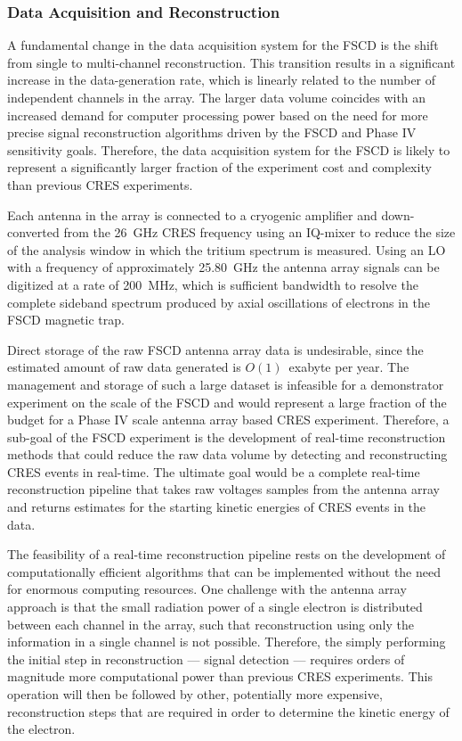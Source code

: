 \subsubsection*{Data Acquisition and Reconstruction}

A fundamental change in the data acquisition system for the FSCD is the shift from single to multi-channel reconstruction. This transition results in a significant increase in the data-generation rate, which is linearly related to the number of independent channels in the array. The larger data volume coincides with an increased demand for computer processing power based on the need for more precise signal reconstruction algorithms driven by the FSCD and Phase IV sensitivity goals. Therefore, the data acquisition system for the FSCD is likely to represent a significantly larger fraction of the experiment cost and complexity than previous CRES experiments.

Each antenna in the array is connected to a cryogenic amplifier and down-converted from the 26~GHz CRES frequency using an IQ-mixer to reduce the size of the analysis window in which the tritium spectrum is measured. Using an LO with a frequency of approximately 25.80~GHz the antenna array signals can be digitized at a rate of 200~MHz, which is sufficient bandwidth to resolve the complete sideband spectrum produced by axial oscillations of electrons in the FSCD magnetic trap. 

Direct storage of the raw FSCD antenna array data is undesirable, since the estimated amount of raw data generated is $O(1)$~exabyte per year. The management and storage of such a large dataset is infeasible for a demonstrator experiment on the scale of the FSCD and would represent a large fraction of the budget for a Phase IV scale antenna array based CRES experiment. Therefore, a sub-goal of the FSCD experiment is the development of real-time reconstruction methods that could reduce the raw data volume by detecting and reconstructing CRES events in real-time. The ultimate goal would be a complete real-time reconstruction pipeline that takes raw voltages samples from the antenna array and returns estimates for the starting kinetic energies of CRES events in the data.

The feasibility of a real-time reconstruction pipeline rests on the development of computationally efficient algorithms that can be implemented without the need for enormous computing resources. One challenge with the antenna array approach is that the small radiation power of a single electron is distributed between each channel in the array, such that reconstruction using only the information in a single channel is not possible. Therefore, the simply performing the initial step in reconstruction --- signal detection --- requires orders of magnitude more computational power than previous CRES experiments. This operation will then be followed by other, potentially more expensive, reconstruction steps that are required in order to determine the kinetic energy of the electron.

